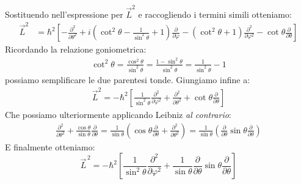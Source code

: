 \documentclass[../../FisicaTeorica.tex]{subfiles}
\begin{document}
Sostituendo nell'espressione per $\vec{L}^2$ e raccogliendo i termini simili otteniamo:
\begin{align*}
\vec{L}^2 &= \hbar^2 \left [
-\frac{\partial^2}{\partial \theta^2} + i\left(\cot^2 \theta -\frac{1}{\sin^2 \theta}+1\right)\frac{\partial}{\partial \varphi} - (\cot^2 \theta +1) \frac{\partial^2}{\partial \varphi^2} -\cot\theta \frac{\partial}{\partial \theta}
\right]
\end{align*}
Ricordando la relazione goniometrica:
\begin{align*}
\cot^2 \theta =\frac{\cos^2 \theta}{\sin^2 \theta} =\frac{1-\sin^2\theta}{\sin^2\theta}=\frac{1}{\sin^2 \theta} -1
\end{align*}
possiamo semplificare le due parentesi tonde. Giungiamo infine a:
\begin{align*}
\vec{L}^2 = -\hbar^2 \left[\frac{1}{\sin^2\theta}\frac{\partial^2}{\partial \varphi^2} +\frac{\partial^2}{\partial \theta^2} + \cot\theta \frac{\partial}{\partial \theta} \right]
\end{align*}
Che possiamo  ulteriormente applicando Leibniz \textit{al contrario}:
\begin{align*}
\frac{\partial^2}{\partial \theta^2} +\frac{\cos\theta}{\sin\theta}\frac{\partial}{\partial \theta} = \frac{1}{\sin\theta}\left(\cos\theta \frac{\partial}{\partial \theta} + \frac{\partial^2}{\partial \theta^2}\right)=\frac{1}{\sin\theta}\left(\frac{\partial}{\partial \theta} \sin\theta \frac{\partial}{\partial \theta}\right)
\end{align*}
E finalmente otteniamo:
\[
\vec{L}^{\,2}=-\hbar^2\left[ \frac{1}{\sin^2 \theta}\frac{\partial^2}{\partial \varphi^2}+\frac{1}{\sin\theta}\frac{\partial}{\partial \theta}\sin\theta \frac{\partial}{\partial \theta}\right]
\]
\end{document}
